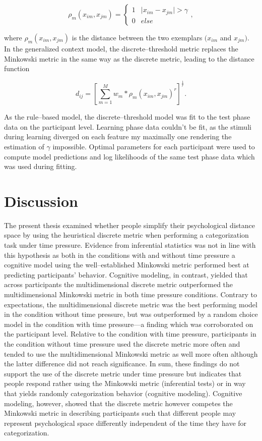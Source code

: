 \documentclass[a4paper,man,natbib]{apa6}
\begin{document}
\begin{equation}
\rho_{m}(x_{im}, x_{jm}) = 
\begin{cases}
	1 & \mid x_{im} - x_{jm} \mid > \gamma \\
	0 & else 
\end{cases},
\end{equation}

where $\rho_{m}(x_{im}, x_{jm})$ is the distance between the two exemplars $(x_{im}$ and $x_{jm})$. In the generalized context model, the discrete--threshold metric replaces the Minkowski metric in the same way as the discrete metric, leading to the distance function

\begin{equation}
d_{ij} = \left[\sum\limits_{m=1}^M w_{m}* \rho_{m}(x_{im}, x_{jm}) ^r\right]^\frac{1}{r}.
\end{equation}

As the rule--based model, the discrete--threshold model was fit to the test phase data on the participant level. Learning phase data couldn't be fit, as the stimuli during learning diverged on each feature my maximally one rendering the estimation of $\gamma$ impossible. Optimal parameters for each participant were used to compute model predictions and log likelihoods of the same test phase data which was used during fitting. 

\section{Discussion}
The present thesis examined whether people simplify their psychological distance space by using the heuristical discrete metric when performing a categorization task under time pressure. Evidence from inferential statistics was not in line with this hypothesis as both in the conditions with and without time pressure a cognitive model using the well--established Minkowski metric performed best at predicting participants' behavior. Cognitive modeling, in contrast, yielded that across participants the multidimensional discrete metric outperformed the multidimensional Minkowski metric in both time pressure conditions. Contrary to expectations, the multidimensional discrete metric was the best performing model in the condition without time pressure, but was outperformed by a random choice model in the condition with time pressure---a finding which was corroborated on the participant level. Relative to the condition with time pressure, participants in the condition without time pressure used the discrete metric more often and tended to use the multidimensional Minkowski metric as well more often although the latter difference did not reach significance. In sum, these findings do not support the use of the discrete metric under time pressure but indicates that people respond rather using the Minkowski metric (inferential tests) or in way that yields randomly categorization behavior (cognitive modeling). Cognitive modeling, however, showed that the discrete metric however competes the Minkowski metric in describing participants such that different people may represent psychological space differently independent of the time they have for categorization.


\end{document}
